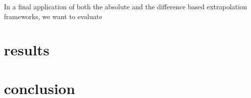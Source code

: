 In a final application of both the absolute and the difference based extrapolation frameworks, we want to evaluate
\section{results}

\section{conclusion}

